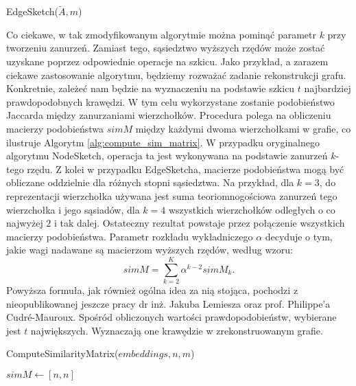     \begin{algorithm}
        \caption{EdgeSketch($\tilde{A},m$)}\label{alg:edge_sketch}
    \end{algorithm}

    Co ciekawe, w tak zmodyfikowanym algorytmie można pominąć parametr $k$ przy tworzeniu zanurzeń. Zamiast tego, sąsiedztwo wyższych rzędów może zostać uzyskane poprzez odpowiednie operacje na szkicu. Jako przykład, a zarazem ciekawe zastosowanie algorytmu, będziemy rozważać zadanie rekonstrukcji grafu. Konkretnie, zależeć nam będzie na wyznaczeniu na podstawie szkicu $t$ najbardziej prawdopodobnych krawędzi. W tym celu wykorzystane zostanie podobieństwo Jaccarda między zanurzaniami wierzchołków. Procedura polega na obliczeniu macierzy podobieństwa $simM$ między każdymi dwoma wierzchołkami w grafie, co ilustruje Algorytm \ref{alg:compute_sim_matrix}. W przypadku oryginalnego algorytmu NodeSketch, operacja ta jest wykonywana na podstawie zanurzeń $k$-tego rzędu. Z kolei w przypadku EdgeSketcha, macierze podobieństwa mogą być obliczane oddzielnie dla różnych stopni sąsiedztwa. Na przykład, dla $k = 3$, do reprezentacji wierzchołka używana jest suma teoriomnogościowa zanurzeń tego wierzchołka i jego sąsiadów, dla $k = 4$ wszystkich wierzchołków odległych o co najwyżej $2$ i tak dalej. Ostateczny rezultat powstaje przez połączenie wszystkich macierzy podobieństwa. Parametr rozkładu wykładniczego $\alpha$ decyduje o tym, jakie wagi nadawane są macierzom wyższych rzędów, według wzoru:
    \begin{equation}  \label{eq:sim_matrix}  
        simM = \sum\limits_{k = 2}^{K} \alpha^{k-2} simM_{k}.
    \end{equation}
    Powyższa formuła, jak również ogólna idea za nią stojąca, pochodzi z nieopublikowanej jeszcze pracy dr inż. Jakuba Lemiesza oraz prof. Philippe'a Cudré-Mauroux. Spośród obliczonych wartości prawdopodobieństw, wybierane jest $t$ największych. Wyznaczają one krawędzie w zrekonstruowanym grafie.
    
    \begin{algorithm}
        \caption{ComputeSimilarityMatrix($embeddings, n, m$)}\label{alg:compute_sim_matrix}
        $simM \gets [n,n]$ 
    \end{algorithm}
